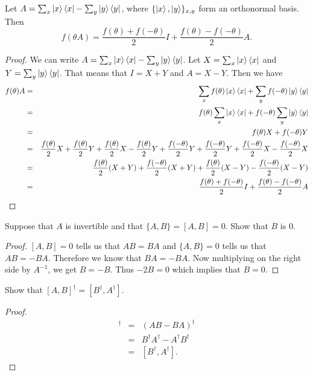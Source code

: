 \documentclass{article}
\begin{document}
\begin{lemma}
  Let $A=\sum_x\ket{x}\bra{x}-\sum_y\ket{y}\bra{y}$, where $\{\ket{x},\ket{y}\}_{x,y}$ form an orthonormal basis.
  Then
  \[
    f(\theta A) = \frac{f(\theta)+f(-\theta)}{2}I + \frac{f(\theta)-f(-\theta)}{2}A.
  \]
  \begin{proof}
    We can write $A=\sum_x\ket{x}\bra{x}-\sum_y\ket{y}\bra{y}$.
    Let $X=\sum_x \ket{x}\bra{x}$ and
    $Y=\sum_y \ket{y}\bra{y}$. That means that
    $I=X+Y$ and $A=X-Y$. Then we have
    \begin{eqnarray*}
      f(\theta)A&=&\sum_xf(\theta)\ket{x}\bra{x}+\sum_yf(-\theta)\ket{y}\bra{y} \\
      &=&f(\theta)\sum_x\ket{x}\bra{x}+f(-\theta)\sum_y\ket{y}\bra{y} \\
      &=&f(\theta)X+f(-\theta)Y \\
      &=&\frac{f(\theta)}{2}X+\frac{f(\theta)}{2}Y+\frac{f(\theta)}{2}X-\frac{f(\theta)}{2}Y+\frac{f(-\theta)}{2}Y+\frac{f(-\theta)}{2}Y+\frac{f(-\theta)}{2}X-\frac{f(-\theta)}{2}X \\
      &=&\frac{f(\theta)}{2}(X+Y)+\frac{f(-\theta)}{2}(X+Y)+\frac{f(\theta)}{2}(X-Y)-\frac{f(-\theta)}{2}(X-Y) \\
      &=&\frac{f(\theta)+f(-\theta)}{2}I+\frac{f(\theta)-f(-\theta)}{2}A
    \end{eqnarray*}
  \end{proof}
\end{lemma}
\setcounter{exercise}{43}
\begin{exercise}
  Suppose that $A$ is invertible and that $\{A,B\}=[A,B]=0$. Show that $B$ is 0.
  \begin{proof}
    $[A,B]=0$ tells us that $AB=BA$ and $\{A,B\}=0$ tells us that $AB=-BA$. Therefore we
    know that $BA=-BA$. Now multiplying on the right side by $A^{-1}$, we get $B=-B$. Thus
    $-2B=0$ which implies that $B=0$.
  \end{proof}
\end{exercise}

\begin{exercise}
  Show that $[A,B]^\dagger=[B^\dagger,A^\dagger]$.
  \begin{proof}
    \begin{eqnarray*}
      [A,B]^\dagger&=&\left(AB-BA\right)^\dagger \\
      &=&B^\dagger A^\dagger - A^\dagger B^\dagger \\
      &=&[B^\dagger,A^\dagger ].
    \end{eqnarray*}
  \end{proof}
\end{exercise}
\end{document}
